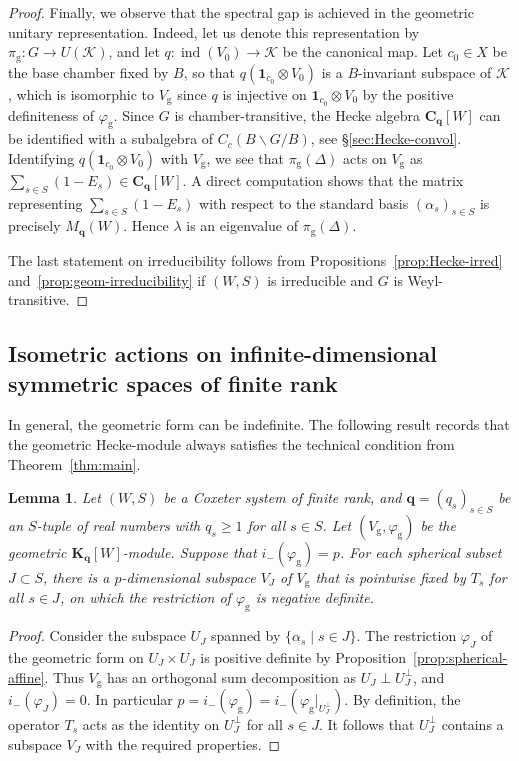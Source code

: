 \documentclass[12pt,a4paper]{amsproc}
\newtheorem{lemma}[theorem]{Lemma}
\theoremstyle{definition}
\DeclareMathOperator{\Ind}{ind}
\newcommand{\CC}{\mathbf C}
\newcommand{\KK}{\mathbf K}
\newcommand{\one}{\mathbf 1}
\newcommand{\qq}{\mathbf q}
\newcommand{\rg}{\mathrm g}
\begin{document}
\begin{proof}
Finally, we observe  that the spectral gap is achieved in the geometric unitary representation. Indeed, let us denote this representation by $\pi_\rg \colon G \to U(\mathcal{K})$, and let $q \colon \Ind(V_0) \to \mathcal K$ be the canonical map. Let $c_0 \in X$ be the base chamber fixed by $B$, so that $q(\one_{c_0} \otimes V_0)$ is a $B$-invariant subspace of $\mathcal K$, which is isomorphic to $V_\rg$ since $q$ is injective on $\one_{c_0} \otimes V_0$ by the positive definiteness of $\varphi_\rg$. Since $G$ is chamber-transitive, the Hecke algebra $\CC_\qq[W]$ can be identified with a subalgebra of $C_c(B\backslash G/B)$, see  \S\ref{sec:Hecke-convol}.  Identifying  $q(\one_{c_0} \otimes V_0)$ with $V_\rg$, we see that $\pi_\rg(\Delta)$ acts on $V_{\rg}$ as $\sum_{s \in S} (1 - E_s) \in \CC_\qq[W]$. 
A direct computation  shows that the matrix representing $\sum_{s \in S} (1 - E_s)$ with respect to the standard basis $(\alpha_s)_{s \in S}$ is precisely  $M_{\textbf{q}}(W)$. Hence $\lambda$ is  an eigenvalue of $\pi_\rg(\Delta)$. 

The last statement on irreducibility   follows from Propositions~\ref{prop:Hecke-irred} and~\ref{prop:geom-irreducibility} if $(W, S)$ is irreducible and $G$ is Weyl-transitive. 
\end{proof}

		
		


\subsection{Isometric actions on infinite-dimensional symmetric spaces of finite rank}\label{sec:actions-sym-sp}

In general, the geometric form can be indefinite. The following result records that the geometric Hecke-module always satisfies the technical condition from Theorem~\ref{thm:main}. 

\begin{lemma}\label{lem:geom-form-tech}
Let $(W, S)$ be a Coxeter system of finite rank, and $\qq = (q_s)_{s \in S}$ be an $S$-tuple of  real numbers with $q_s \geq 1$ for all $s \in S$. Let $(V_\rg, \varphi_\rg)$ be the geometric $\KK_\qq[W]$-module. Suppose that $i_-(\varphi_\rg) = p$. For each spherical subset $J  \subset S$, there is a   $p$-dimensional subspace $V_J$ of $V_\rg$ that is pointwise fixed by $T_s$  for all $s \in J$, on which the restriction of $\varphi_\rg$ is negative definite. 
\end{lemma}
\begin{proof}
Consider the subspace $U_J$ spanned by $\{\alpha_s\mid s \in J\}$. The restriction $\varphi_J$ of the geometric form on  $U_J \times U_J$ is positive definite by Proposition~\ref{prop:spherical-affine}. Thus $V_\rg$ has an orthogonal sum decomposition as $U_J \perp U_J^\perp$, and $i_-(\varphi_J)=0$. In particular  $p = i_-(\varphi_\rg) = i_-(\varphi_\rg|_{U_J^\perp})$. By definition, the operator $T_s$ acts as the identity on $U_J^\perp$ for all $s \in J$. It follows that $U_J^\perp$ contains a subspace $V_J$ with the required properties. 
\end{proof}
\end{document}
